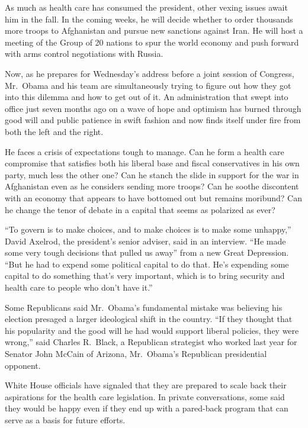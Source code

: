 ﻿\documentclass[12pt]{article}
\begin{document}
As much as health care has consumed the president, other vexing issues await him in the fall. In the
coming weeks, he will decide whether to order thousands more troops to Afghanistan and pursue new
sanctions against Iran. He will host a meeting of the Group of 20 nations to spur the world economy
and push forward with arms control negotiations with Russia.

Now, as he prepares for Wednesday's address before a joint session of Congress, Mr.~Obama and his
team are simultaneously trying to figure out how they got into this dilemma and how to get out of
it. An administration that swept into office just seven months ago on a wave of hope and optimism
has burned through good will and public patience in swift fashion and now finds itself under fire
from both the left and the right.

He faces a crisis of expectations tough to manage. Can he form a health care compromise that
satisfies both his liberal base and fiscal conservatives in his own party, much less the other one?
Can he stanch the slide in support for the war in Afghanistan even as he considers sending more
troops? Can he soothe discontent with an economy that appears to have bottomed out but remains
moribund? Can he change the tenor of debate in a capital that seems as polarized as ever?

``To govern is to make choices, and to make choices is to make some unhappy,'' David Axelrod, the
president's senior adviser, said in an interview. ``He made some very tough decisions that pulled us
away'' from a new Great Depression. ``But he had to expend some political capital to do that. He's
expending some capital to do something that's very important, which is to bring security and health
care to people who don't have it.''

Some Republicans said Mr.~Obama's fundamental mistake was believing his election presaged a larger
ideological shift in the country. ``If they thought that his popularity and the good will he had
would support liberal policies, they were wrong,'' said Charles R.~Black, a Republican strategist
who worked last year for Senator John McCain of Arizona, Mr.~Obama's Republican presidential
opponent.

White House officials have signaled that they are prepared to scale back their aspirations for the
health care legislation. In private conversations, some said they would be happy even if they end up
with a pared-back program that can serve as a basis for future efforts.
\end{document}
